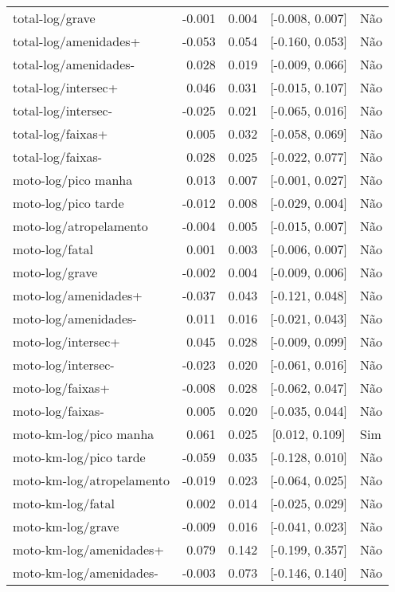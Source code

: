 \begin{longtable}{lrrcl}
total-log/grave & -0.001 & 0.004 & {}[-0.008, 0.007] & Não\\
total-log/amenidades+ & -0.053 & 0.054 & {}[-0.160, 0.053] & Não\\
total-log/amenidades- & 0.028 & 0.019 & {}[-0.009, 0.066] & Não\\
total-log/intersec+ & 0.046 & 0.031 & {}[-0.015, 0.107] & Não\\
total-log/intersec- & -0.025 & 0.021 & {}[-0.065, 0.016] & Não\\
total-log/faixas+ & 0.005 & 0.032 & {}[-0.058, 0.069] & Não\\
total-log/faixas- & 0.028 & 0.025 & {}[-0.022, 0.077] & Não\\
moto-log/pico manha & 0.013 & 0.007 & {}[-0.001, 0.027] & Não\\
moto-log/pico tarde & -0.012 & 0.008 & {}[-0.029, 0.004] & Não\\
moto-log/atropelamento & -0.004 & 0.005 & {}[-0.015, 0.007] & Não\\
moto-log/fatal & 0.001 & 0.003 & {}[-0.006, 0.007] & Não\\
moto-log/grave & -0.002 & 0.004 & {}[-0.009, 0.006] & Não\\
moto-log/amenidades+ & -0.037 & 0.043 & {}[-0.121, 0.048] & Não\\
moto-log/amenidades- & 0.011 & 0.016 & {}[-0.021, 0.043] & Não\\
moto-log/intersec+ & 0.045 & 0.028 & {}[-0.009, 0.099] & Não\\
moto-log/intersec- & -0.023 & 0.020 & {}[-0.061, 0.016] & Não\\
moto-log/faixas+ & -0.008 & 0.028 & {}[-0.062, 0.047] & Não\\
moto-log/faixas- & 0.005 & 0.020 & {}[-0.035, 0.044] & Não\\
moto-km-log/pico manha & 0.061 & 0.025 & {}[0.012, 0.109] & Sim\\
moto-km-log/pico tarde & -0.059 & 0.035 & {}[-0.128, 0.010] & Não\\
moto-km-log/atropelamento & -0.019 & 0.023 & {}[-0.064, 0.025] & Não\\
moto-km-log/fatal & 0.002 & 0.014 & {}[-0.025, 0.029] & Não\\
moto-km-log/grave & -0.009 & 0.016 & {}[-0.041, 0.023] & Não\\
moto-km-log/amenidades+ & 0.079 & 0.142 & {}[-0.199, 0.357] & Não\\
moto-km-log/amenidades- & -0.003 & 0.073 & {}[-0.146, 0.140] & Não\\

\end{longtable}
